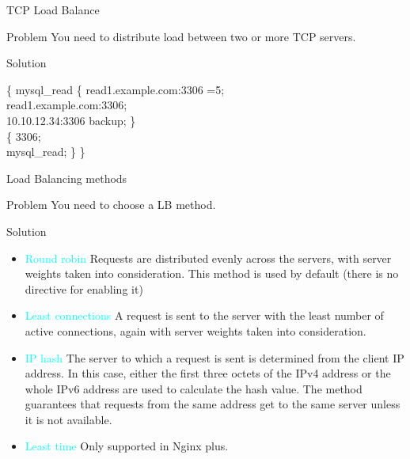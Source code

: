 \documentclass{beamer}
\begin{document}
\begin{frame}{TCP Load Balance}
\scriptsize
\begin{minipage}[t]{0.8\textwidth}
	\begin{block}{Problem}
		\vspace{0.01\textheight}
		You need to distribute load between two or more TCP servers.
	\end{block}
	
	\begin{block}{Solution}
		\vspace{0.01\textheight}

		\begin{Alms*}
			 \{ \NI
			 mysql\_read \{ \NI
			 read1.example.com:3306	=5; \\
			 read1.example.com:3306; 	\\
			 10.10.12.34:3306		backup;
			\ND \} \\
			 \{ \NI
			 3306; \\
			 mysql\_read;
			\ND \}
			\ND \}
		\end{Alms*}
	\end{block}
\end{minipage}
\end{frame}

\begin{frame}{Load Balancing methods}

\scriptsize
\begin{block}{Problem}
	\vspace{0.01\textheight}
	You need to choose a LB method.
\end{block}

\begin{block}{Solution}
\begin{itemize}
	\item \textcolor{cyan}{Round robin} Requests are distributed evenly across the servers, with server weights taken into consideration. This method is used by default (there is no directive for enabling it)
	\item \textcolor{cyan}{Least connections} A request is sent to the server with the least number of active connections, again with server weights taken into consideration.
	\item \textcolor{cyan}{IP hash} The server to which a request is sent is determined from the client IP address. In this case, either the first three octets of the IPv4 address or the whole IPv6 address are used to calculate the hash value. The method guarantees that requests from the same address get to the same server unless it is not available.
	\item \textcolor{cyan}{Least time} Only supported in Nginx plus.
\end{itemize}
\end{block}

\end{frame}
\end{document}
